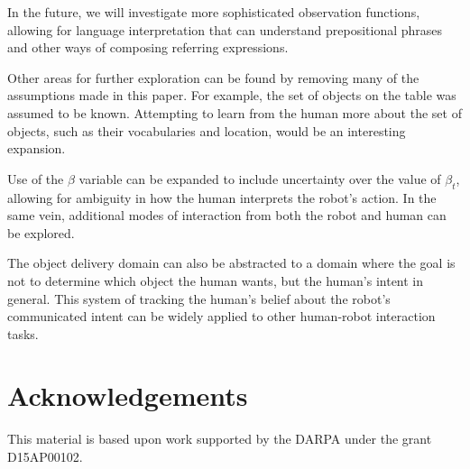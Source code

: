 \documentclass[conference]{IEEEtran}
\begin{document}
In the future, we will investigate more sophisticated observation functions, allowing for language interpretation that can understand prepositional phrases and other ways of composing referring expressions. 

Other areas for further exploration can be found by removing many of the assumptions made in this paper. For example, the set of objects on the table was assumed to be known. Attempting to learn from the human more about the set of objects, such as their vocabularies and location, would be an interesting expansion. 

Use of the $\beta$ variable can be expanded to include uncertainty over the value of $\beta_t$, allowing for ambiguity in how the human interprets the robot's action. In the same vein, additional modes of interaction from both the robot and human can be explored. 

The object delivery domain can also be abstracted to a domain where the goal is not to determine which object the human wants, but the human's intent in general. This system of tracking the human's belief about the robot's communicated intent can be widely applied to other human-robot interaction tasks. 



\section{Acknowledgements}

This material is based upon work supported by the  DARPA under the grant D15AP00102.



\end{document}
